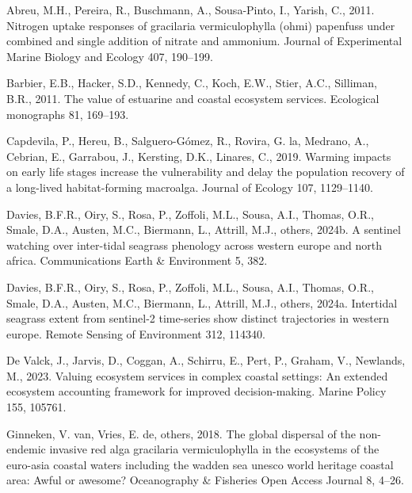 \documentclass[
  letterpaper,
  DIV=11,
  numbers=noendperiod]{scrartcl}
\newlength{\cslhangindent}
\newenvironment{CSLReferences}[2] %
 {\begin{list}{}{%
  \setlength{\itemindent}{0pt}
  \setlength{\leftmargin}{0pt}
  \setlength{\parsep}{0pt}
  \ifodd #1
   \setlength{\leftmargin}{\cslhangindent}
   \setlength{\itemindent}{-1\cslhangindent}
  \fi
  \setlength{\itemsep}{#2\baselineskip}}}
 {\end{list}}
\begin{document}
\label{refs}
\begin{CSLReferences}{1}{0}
Abreu, M.H., Pereira, R., Buschmann, A., Sousa-Pinto, I., Yarish, C.,
2011. Nitrogen uptake responses of gracilaria vermiculophylla (ohmi)
papenfuss under combined and single addition of nitrate and ammonium.
Journal of Experimental Marine Biology and Ecology 407, 190--199.

Barbier, E.B., Hacker, S.D., Kennedy, C., Koch, E.W., Stier, A.C.,
Silliman, B.R., 2011. The value of estuarine and coastal ecosystem
services. Ecological monographs 81, 169--193.

Capdevila, P., Hereu, B., Salguero-Gómez, R., Rovira, G. la, Medrano,
A., Cebrian, E., Garrabou, J., Kersting, D.K., Linares, C., 2019.
Warming impacts on early life stages increase the vulnerability and
delay the population recovery of a long-lived habitat-forming macroalga.
Journal of Ecology 107, 1129--1140.

Davies, B.F.R., Oiry, S., Rosa, P., Zoffoli, M.L., Sousa, A.I., Thomas,
O.R., Smale, D.A., Austen, M.C., Biermann, L., Attrill, M.J., others,
2024b. A sentinel watching over inter-tidal seagrass phenology across
western europe and north africa. Communications Earth \& Environment 5,
382.

Davies, B.F.R., Oiry, S., Rosa, P., Zoffoli, M.L., Sousa, A.I., Thomas,
O.R., Smale, D.A., Austen, M.C., Biermann, L., Attrill, M.J., others,
2024a. Intertidal seagrass extent from sentinel-2 time-series show
distinct trajectories in western europe. Remote Sensing of Environment
312, 114340.

De Valck, J., Jarvis, D., Coggan, A., Schirru, E., Pert, P., Graham, V.,
Newlands, M., 2023. Valuing ecosystem services in complex coastal
settings: An extended ecosystem accounting framework for improved
decision-making. Marine Policy 155, 105761.

Ginneken, V. van, Vries, E. de, others, 2018. The global dispersal of
the non-endemic invasive red alga gracilaria vermiculophylla in the
ecosystems of the euro-asia coastal waters including the wadden sea
unesco world heritage coastal area: Awful or awesome? Oceanography \&
Fisheries Open Access Journal 8, 4--26.


\end{CSLReferences}
\end{document}
